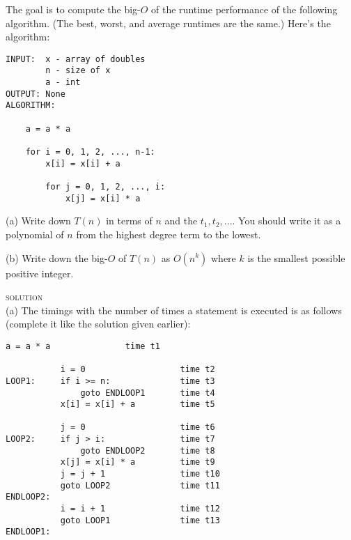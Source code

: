 The goal is to compute the big-$O$ of the runtime performance
of the following algorithm. 
(The best, worst, and average runtimes are the same.)
Here's the algorithm:
\begin{Verbatim}[frame=single]
INPUT:  x - array of doubles
        n - size of x
        a - int
OUTPUT: None
ALGORITHM:

    a = a * a                              

    for i = 0, 1, 2, ..., n-1:
        x[i] = x[i] + a                    

        for j = 0, 1, 2, ..., i:
            x[j] = x[i] * a                

\end{Verbatim}

(a) Write down $T(n)$ in terms of $n$ and the $t_1, t_2, ...$.
You should write it as a polynomial of $n$ from the highest
degree term to the lowest.

(b) Write down the big-$O$ of $T(n)$ as $O(n^k)$
where $k$ is the smallest possible  positive integer.


\newpage
\textsc{solution}\\
(a) 
The timings with the number of times a statement is executed
is as follows (complete it like the solution given earlier):
\begin{Verbatim}[frame=single,commandchars]
           a = a * a               time t1

           i = 0                   time t2
LOOP1:     if i >= n:              time t3
               goto ENDLOOP1       time t4
           x[i] = x[i] + a         time t5

           j = 0                   time t6
LOOP2:     if j > i:               time t7
               goto ENDLOOP2       time t8
           x[j] = x[i] * a         time t9
           j = j + 1               time t10
           goto LOOP2              time t11
ENDLOOP2:
           i = i + 1               time t12
           goto LOOP1              time t13
ENDLOOP1:
\end{Verbatim}
